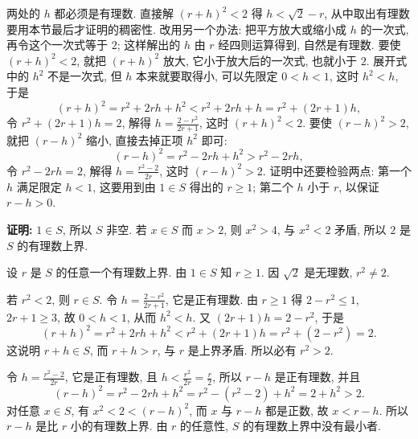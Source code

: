 \documentclass[UTF8,openany]{ctexbook}
\theoremstyle{chinesetextbook}
\newenvironment{cnproof}{\par\indent\textbf{证明:} \ignorespaces}{\par}
\begin{document}
两处的 $h$ 都必须是有理数. 直接解 $(r+h)^2<2$ 得 $h<\sqrt2-r$, 从中取出有理数要用本节最后才证明的稠密性. 改用另一个办法: 把平方放大或缩小成 $h$ 的一次式, 再令这个一次式等于 $2$; 这样解出的 $h$ 由 $r$ 经四则运算得到, 自然是有理数. 要使 $(r+h)^2<2$, 就把 $(r+h)^2$ 放大, 它小于放大后的一次式, 也就小于 $2$. 展开式中的 $h^2$ 不是一次式, 但 $h$ 本来就要取得小, 可以先限定 $0<h<1$, 这时 $h^2<h$, 于是
\[
(r+h)^2=r^2+2rh+h^2<r^2+2rh+h=r^2+(2r+1)h,
\]
令 $r^2+(2r+1)h=2$, 解得 $\displaystyle h=\frac{2-r^2}{2r+1}$, 这时 $(r+h)^2<2$. 要使 $(r-h)^2>2$, 就把 $(r-h)^2$ 缩小, 直接去掉正项 $h^2$ 即可:
\[
(r-h)^2=r^2-2rh+h^2>r^2-2rh,
\]
令 $r^2-2rh=2$, 解得 $\displaystyle h=\frac{r^2-2}{2r}$, 这时 $(r-h)^2>2$. 证明中还要检验两点: 第一个 $h$ 满足限定 $h<1$, 这要用到由 $1\in S$ 得出的 $r\ge1$; 第二个 $h$ 小于 $r$, 以保证 $r-h>0$.
\begin{cnproof}
$1\in S$, 所以 $S$ 非空. 若 $x\in S$ 而 $x>2$, 则 $x^2>4$, 与 $x^2<2$ 矛盾, 所以 $2$ 是 $S$ 的有理数上界.

设 $r$ 是 $S$ 的任意一个有理数上界. 由 $1\in S$ 知 $r\ge1$. 因 $\sqrt2$ 是无理数, $r^2\ne2$.

若 $r^2<2$, 则 $r\in S$. 令 $\displaystyle h=\frac{2-r^2}{2r+1}$, 它是正有理数. 由 $r\ge1$ 得 $2-r^2\le1$, $2r+1\ge3$, 故 $0<h<1$, 从而 $h^2<h$. 又 $(2r+1)h=2-r^2$, 于是
\[
(r+h)^2=r^2+2rh+h^2<r^2+(2r+1)h=r^2+(2-r^2)=2.
\]
这说明 $r+h\in S$, 而 $r+h>r$, 与 $r$ 是上界矛盾. 所以必有 $r^2>2$.

令 $\displaystyle h=\frac{r^2-2}{2r}$, 它是正有理数, 且 $\displaystyle h<\frac{r^2}{2r}=\frac r2$, 所以 $r-h$ 是正有理数, 并且
\[
(r-h)^2=r^2-2rh+h^2=r^2-(r^2-2)+h^2=2+h^2>2.
\]
对任意 $x\in S$, 有 $x^2<2<(r-h)^2$, 而 $x$ 与 $r-h$ 都是正数, 故 $x<r-h$. 所以 $r-h$ 是比 $r$ 小的有理数上界. 由 $r$ 的任意性, $S$ 的有理数上界中没有最小者.
\end{cnproof}
\end{document}

